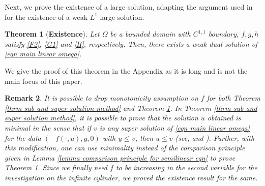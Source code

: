 \documentclass{amsart}
\newtheorem{theorem}{Theorem}[section]
\newtheorem{remark}[theorem]{Remark}
\begin{document}
Next, we prove the existence of a large solution, adapting the argument used in \cite{Abatangelo2015LargesHarmonic} for the existence of a weak $L^{1}$ large solution. 
\begin{theorem}[\textbf{Existence}]\label{theorem existence}
    Let $\Omega$ be a bounded domain with $C^{1,1}$ boundary, $f,g,h$ satisfy \ref{F2}, \ref{G1} and \ref{H}, respectively. Then, there exists a weak dual solution of \eqref{eqn main linear omega}.
\end{theorem}
We give the proof of this theorem in the Appendix as it is long and is not the main focus of this paper.
\begin{remark}\label{remark dropping monotonicity}
    It is possible to drop monotonicity assumption on $f$ for both Theorem \ref{thrm sub and super solution method} and Theorem \ref{theorem existence}. In Theorem \ref{thrm sub and super solution method}, it is possible to prove that the solution $u$ obtained is minimal in the sense that if $v$ is any super solution of \eqref{eqn main linear omega} for the data $(-f(\cdot,u),g,0)$ with $\underline{u}\leq v$, then $u\leq v$ (see, \cite{Abatangelo2015LargesHarmonic} and \cite[Corollary 2.2]{DumontDupaigneOlivierRuadulescu2007}). Further, with this modification, one can use minimality instead of the comparison principle given in Lemma \ref{lemma comparison principle for semilinear eqn} to prove Theorem \ref{theorem existence}. Since we finally need $f$ to be increasing in the second variable for the investigation on the infinite cylinder, we proved the existence result for the same.
\end{remark}
 
\end{document}
